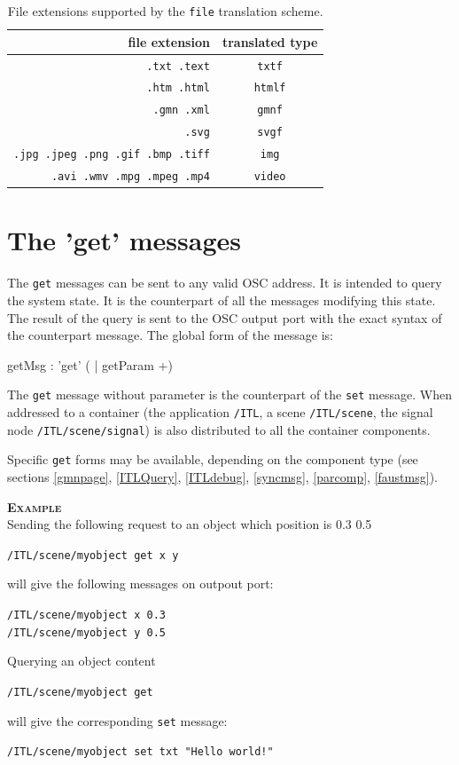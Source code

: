 \documentclass[a4paper,twoside]{report}
\newcommand{\toplevel}[1]	{\chapter{#1}}
\newcommand{\sublevel}[1]	{\section{#1}}
\newcommand{\OSC}[1]		{\texttt{#1}}
\newcommand{\example}		{\textbf{\hspace{-1.5cm}\textbf{\textsc{Example }}}}
\newcommand{\sample}	[1]			{\vspace{-2mm}\begin{center}\colorbox{mygrey}{
								\begin{minipage}[t]{0.9\columnwidth} 
								{\small \texttt{#1}}
								\end{minipage}}\end{center}}
\newcommand{\sampleindent}	{ \hspace{0.5cm} }
\begin{document}
\begin{table}[htdp]
\caption{File extensions supported by the \OSC{file} translation scheme.}
\begin{center}
\begin{tabular}{|r|c|}
\hline
file extension & translated type \\
\hline
\OSC{.txt .text}		& \OSC{txtf} \\
\OSC{.htm .html}		& \OSC{htmlf} \\
\OSC{.gmn .xml}		& \OSC{gmnf} \\
\OSC{.svg} 			& \OSC{svgf} \\
\OSC{.jpg .jpeg .png .gif .bmp .tiff} & \OSC{img} \\
\OSC{.avi .wmv .mpg .mpeg .mp4} & \OSC{video} \\
\hline
\end{tabular}
\end{center}
\label{fileTranslate}
\end{table}


\toplevel{The 'get' messages}
\label{getsect}

The \OSC{get} messages can be sent to any valid OSC address. It is intended to query the system state. It is the counterpart of all the messages modifying this state.  The result of the query is sent to the OSC output port with the exact syntax of the counterpart message. 
The global form of the message is:
\begin{rail}
getMsg : 'get' ( | getParam +)
\end{rail}

The \OSC{get} message without parameter is the counterpart of the \OSC{set} message. When addressed to a container (the application \OSC{/ITL}, a scene \OSC{/ITL/scene}, the signal node \OSC{/ITL/scene/signal}) is also distributed to all the container components.

Specific \OSC{get} forms may be available, depending on the component type (see sections \ref{gmnpage},  \ref{ITLQuery}, \ref{ITLdebug}, \ref{syncmsg}, \ref{parcomp}, \ref{faustmsg}).

\example \\
Sending the following request to an object which position is 0.3 0.5
\sample{/ITL/scene/myobject get x y}
\sampleindent will give the following messages on outpout port:
\sample{/ITL/scene/myobject x 0.3 \\
/ITL/scene/myobject y 0.5}
Querying an object content
\sample{/ITL/scene/myobject get}
\sampleindent will give the corresponding \OSC{set} message:
\sample{/ITL/scene/myobject set txt "Hello world!"}
\end{document}

